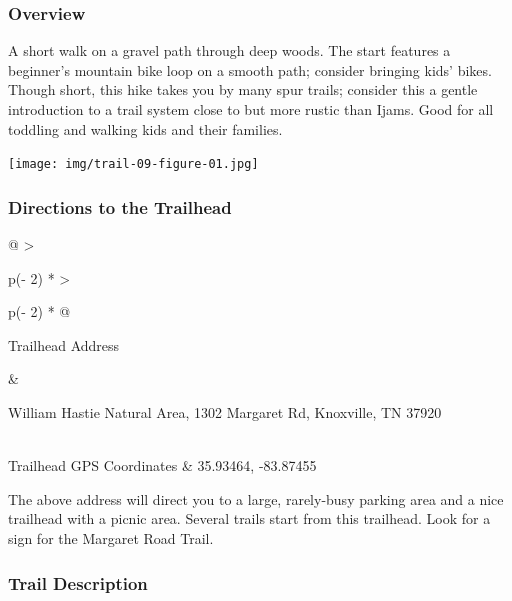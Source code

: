 \documentclass[
  letterpaper,
  DIV=11,
  numbers=noendperiod]{scrartcl}
\begin{document}
\hypertarget{overview-8}{%
\subsubsection{Overview}\label{overview-8}}

A short walk on a gravel path through deep woods. The start features a
beginner's mountain bike loop on a smooth path; consider bringing kids'
bikes. Though short, this hike takes you by many spur trails; consider
this a gentle introduction to a trail system close to but more rustic
than Ijams. Good for all toddling and walking kids and their families.

\texttt{[image: img/trail-09-figure-01.jpg]}

\hypertarget{directions-to-the-trailhead-8}{%
\subsubsection{Directions to the
Trailhead}\label{directions-to-the-trailhead-8}}

\begin{longtable}[]{@{}
  >{\raggedright\arraybackslash}p{(\columnwidth - 2\tabcolsep) * }
  >{\raggedright\arraybackslash}p{(\columnwidth - 2\tabcolsep) * }@{}}
\toprule\noalign{}
\begin{minipage}[b]{\linewidth}\raggedright
Trailhead Address
\end{minipage} & \begin{minipage}[b]{\linewidth}\raggedright
William Hastie Natural Area, 1302 Margaret Rd, Knoxville, TN 37920
\end{minipage} \\
\midrule\noalign{}
\endhead
\bottomrule\noalign{}
\endlastfoot
Trailhead GPS Coordinates & 35.93464, -83.87455 \\
\end{longtable}

The above address will direct you to a large, rarely-busy parking area
and a nice trailhead with a picnic area. Several trails start from this
trailhead. Look for a sign for the Margaret Road Trail.

\hypertarget{trail-description-8}{%
\subsubsection{Trail Description}\label{trail-description-8}}
\end{document}
